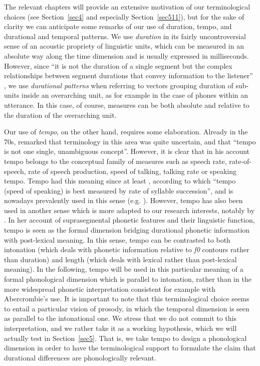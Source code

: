 The relevant chapters will provide an extensive motivation of our terminological choices (see Section~\ref{sec4} and especially Section~\ref{sec511}), but for the sake of clarity we can anticipate some remarks of our use of duration, tempo, and durational and temporal patterns. We use \textit{duration} in its fairly uncontroversial sense of an acoustic propriety of linguistic units, which can be measured in an absolute way along the time dimension and is usually expressed in milliseconds. However, since ``it is not the duration of a single segment but the complex relationships between segment durations that convey information to the listener'' \citep{lyberg1981observations}, we use \textit{durational patterns} when referring to vectors grouping duration of sub-units inside an overarching unit, as for example in the case of phones within an utterance. In this case, of course, measures can be both absolute and relative to the duration of the overarching unit.

Our use of \textit{tempo}, on the other hand, requires some elaboration. Already in the 70s, \citet{wood1973speech} remarked that terminology in this area was quite uncertain, and that ``tempo is not one single, unambiguous concept''. However, it is clear that in his account tempo belongs to the conceptual family of measures such as speech rate, rate-of-speech, rate of speech production, speed of talking, talking rate or speaking tempo. Tempo had this meaning since at least \citet{abercrombie1967elements}, according to which ``tempo (speed of speaking) is best measured by rate of syllable succession'', and is nowadays prevalently used in this sense (e.g. \citealt{trouvain2004tempo}). However, tempo has also been used in another sense which is more adapted to our research interests, notably by \citet{lehiste1970suprasegmentals}. In her account of suprasegmental phonetic features and their linguistic function, tempo is seen as the formal dimension bridging durational phonetic information with post-lexical meaning. In this sense, tempo can be contrasted to both intonation (which deals with phonetic information relative to \textit{f0} contours rather than duration) and length (which deals with lexical rather than post-lexical meaning). In the following, tempo will be used in this particular meaning of a formal phonological dimension which is parallel to intonation, rather than in the more widespread phonetic interpretation consistent for example with Abercrombie's use. It is important to note that this terminological choice seems to entail a particular vision of prosody, in which the temporal dimension is seen as parallel to the intonational one. We stress that we do not commit to this interpretation, and we rather take it as a working hypothesis, which we will actually test in Section~\ref{sec5}. That is, we take tempo to design a phonological dimension in order to have the terminological support to formulate the claim that durational differences are phonologically relevant.

